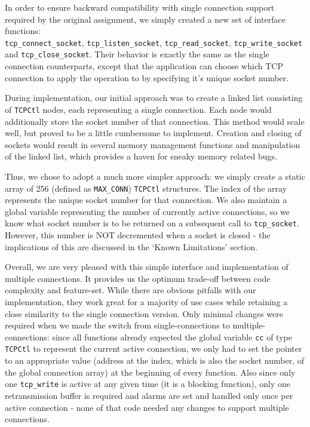 \documentclass{article}
\begin{document}
In order to ensure backward compatibility with single connection support required by the original assignment, we simply created a new set of interface functions:\\
\texttt{tcp\_connect\_socket}, \texttt{tcp\_listen\_socket}, \texttt{tcp\_read\_socket}, \texttt{tcp\_write\_socket} and \texttt{tcp\_close\_socket}. Their behavior is exactly the same as the single connection counterparts, except that the application can choose which TCP connection to apply the operation to by specifying it's unique socket number.

During implementation, our initial approach was to create a linked list consisting of \texttt{TCPCtl} nodes, each representing a single connection. Each node would additionally store the socket number of that connection. This method would scale well, but proved to be a little cumbersome to implement. Creation and closing of sockets would result in several memory management functions and manipulation of the linked list, which provides a haven for sneaky memory related bugs.

Thus, we chose to adopt a much more simpler approach: we simply create a static array of 256 (defined as \texttt{MAX\_CONN}) \texttt{TCPCtl} structures. The index of the array represents the unique socket number for that connection. We also maintain a global variable representing the number of currently active connections, so we know what socket number is to be returned on a subsequent call to \texttt{tcp\_socket}. However, this number is NOT decremented when a socket is closed - the implications of this are discussed in the `Known Limitations' section.

Overall, we are very pleased with this simple interface and implementation of multiple connections. It provides us the optimum trade-off between code complexity and feature-set. While there are obvious pitfalls with our implementation, they work great for a majority of use cases while retaining a close similarity to the single connection version. Only minimal changes were required when we made the switch from single-connections to multiple-connections: since all functions already expected the global variable \texttt{cc} of type \texttt{TCPCtl} to represent the current active connection, we only had to set the pointer to an appropriate value (address at the index, which is also the socket number, of the global connection array) at the beginning of every function. Also since only one \texttt{tcp\_write} is active at any given time (it is a blocking function), only one retransmission buffer is required and alarms are set and handled only once per active connection - none of that code needed any changes to support multiple connections.
\end{document}
